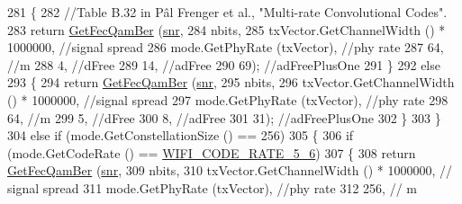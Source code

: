 \begin{DoxyCode}
281             \{
282               \textcolor{comment}{//Table B.32  in Pâl Frenger et al., "Multi-rate Convolutional Codes".}
283               \textcolor{keywordflow}{return} \hyperlink{classns3_1_1YansErrorRateModel_a456a5ba3fc8c6a9fe67ed25971364ff0}{GetFecQamBer} (\hyperlink{lte__amc_8m_a7543c5e4e80c828b652e0c63e4a6de70}{snr},
284                                    nbits,
285                                    txVector.GetChannelWidth () * 1000000, \textcolor{comment}{//signal spread}
286                                    mode.GetPhyRate (txVector), \textcolor{comment}{//phy rate}
287                                    64, \textcolor{comment}{//m}
288                                    4, \textcolor{comment}{//dFree}
289                                    14, \textcolor{comment}{//adFree}
290                                    69); \textcolor{comment}{//adFreePlusOne}
291             \}
292           \textcolor{keywordflow}{else}
293             \{
294               \textcolor{keywordflow}{return} \hyperlink{classns3_1_1YansErrorRateModel_a456a5ba3fc8c6a9fe67ed25971364ff0}{GetFecQamBer} (\hyperlink{lte__amc_8m_a7543c5e4e80c828b652e0c63e4a6de70}{snr},
295                                    nbits,
296                                    txVector.GetChannelWidth () * 1000000, \textcolor{comment}{//signal spread}
297                                    mode.GetPhyRate (txVector), \textcolor{comment}{//phy rate}
298                                    64, \textcolor{comment}{//m}
299                                    5, \textcolor{comment}{//dFree}
300                                    8, \textcolor{comment}{//adFree}
301                                    31); \textcolor{comment}{//adFreePlusOne}
302             \}
303         \}
304       \textcolor{keywordflow}{else} \textcolor{keywordflow}{if} (mode.GetConstellationSize () == 256)
305         \{
306           \textcolor{keywordflow}{if} (mode.GetCodeRate () == \hyperlink{namespacens3_aeaf3a86fd4bdb7829955238fba43e2adaf0309d61b4cf97e5718f6d3b9fdba3aa}{WIFI\_CODE\_RATE\_5\_6})
307             \{
308               \textcolor{keywordflow}{return} \hyperlink{classns3_1_1YansErrorRateModel_a456a5ba3fc8c6a9fe67ed25971364ff0}{GetFecQamBer} (\hyperlink{lte__amc_8m_a7543c5e4e80c828b652e0c63e4a6de70}{snr},
309                                    nbits,
310                                    txVector.GetChannelWidth () * 1000000, \textcolor{comment}{// signal spread}
311                                    mode.GetPhyRate (txVector), \textcolor{comment}{//phy rate}
312                                    256, \textcolor{comment}{// m}

\end{DoxyCode}

